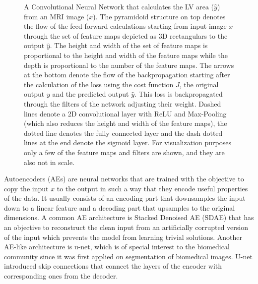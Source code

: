 \documentclass[journal]{IEEEtran}
\begin{document}
\begin{figure}[!t]
	\caption{A Convolutional Neural Network that calculates the LV area ($\hat{y}$) from an MRI image ($x$).
	The pyramidoid structure on top denotes the flow of the feed-forward calculations starting from input image $x$ through the set of feature maps depicted as 3D rectangulars to the output $\hat{y}$.
	The height and width of the set of feature maps is proportional to the height and width of the feature maps while the depth is proportional to the number of the feature maps.
	The arrows at the bottom denote the flow of the backpropagation starting after the calculation of the loss using the cost function $J$, the original output $y$ and the predicted output $\hat{y}$.
	This loss is backpropagated through the filters of the network adjusting their weight.
	Dashed lines denote a 2D convolutional layer with ReLU and Max-Pooling (which also reduces the height and width of the feature maps), the dotted line denotes the fully connected layer and the dash dotted lines at the end denote the sigmoid layer.
	For visualization purposes only a few of the feature maps and filters are shown, and they are also not in scale.}
	\label{fig:cnn}
\end{figure}

Autoencoders (AEs) are neural networks that are trained with the objective to copy the input $x$ to the output in such a way that they encode useful properties of the data.
It usually consists of an encoding part that downsamples the input down to a linear feature and a decoding part that upsamples to the original dimensions.
A common AE architecture is Stacked Denoised AE (SDAE) that has an objective to reconstruct the clean input from an artificially corrupted version of the input\cite{vincent2010stacked} which prevents the model from learning trivial solutions.
Another AE-like architecture is u-net\cite{ronneberger2015u}, which is of special interest to the biomedical community since it was first applied on segmentation of biomedical images.
U-net introduced skip connections that connect the layers of the encoder with corresponding ones from the decoder.
\end{document}
